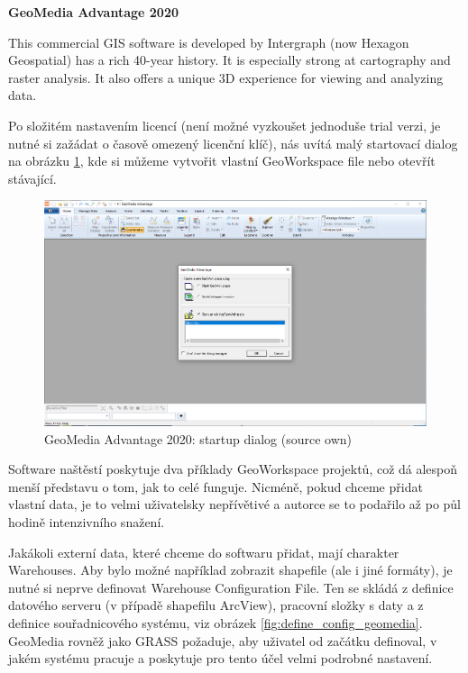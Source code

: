 \documentclass[a4paper,10pt,twoside]{article}
\begin{document}
\bigskip

\noindent \textbf {GeoMedia Advantage 2020}

\noindent This commercial GIS software is developed by  Intergraph (now Hexagon Geospatial) has  a rich 40-year history. It is especially strong at cartography and raster analysis.  It also offers a unique 3D experience for viewing and analyzing data.

Po složitém nastavením licencí (není možné vyzkoušet jednoduše trial verzi, je nutné si zažádat o časově omezený licenční klíč), nás uvítá malý startovací dialog na obrázku \ref{fig:geomedia_startup}, kde si můžeme vytvořit vlastní GeoWorkspace file nebo otevřít stávající. 

\vspace{0.3cm}
\begin{figure}[hbt!] 
\begin{center}
\includegraphics[width=15cm]{../pictures/geomedia_startup.png} 
\caption[GeoMedia Advantage 2020: startup dialog (source own)]{GeoMedia Advantage 2020: startup dialog (source own)}
\label{fig:geomedia_startup}
\end{center}
\end{figure}

\noindent Software naštěstí poskytuje dva příklady GeoWorkspace projektů, což dá alespoň menší představu o tom, jak to celé funguje. Nicméně, pokud chceme přidat vlastní data, je to velmi uživatelsky nepřívětivé a autorce se to podařilo až po půl hodině intenzivního snažení. 

Jakákoli externí data, které chceme do softwaru přidat, mají charakter Warehouses. Aby bylo možné například zobrazit shapefile (ale i jiné formáty), je nutné si neprve definovat Warehouse Configuration File. Ten se skládá z definice datového serveru (v případě shapefilu ArcView), pracovní složky s daty a z definice souřadnicového systému, viz obrázek \ref{fig:define_config_geomedia}. GeoMedia rovněž jako GRASS požaduje, aby uživatel od začátku definoval, v jakém systému pracuje a poskytuje pro tento účel velmi podrobné nastavení.
\end{document}
